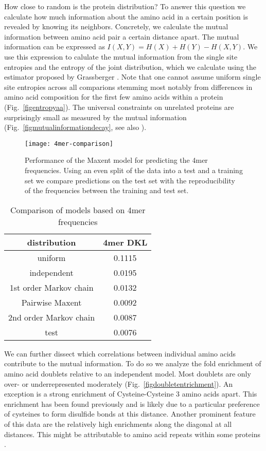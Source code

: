 \documentclass[superscriptaddress,twocolumn,pre]{revtex4}
\newcommand{\<}{\langle}
\renewcommand{\>}{\rangle}
\begin{document}
How close to random is the protein distribution? To answer this question we calculate how much information about the amino acid in a certain position is revealed by knowing its neighbors. Concretely, we calculate the mutual information between amino acid pair a certain distance apart. The mutual information can be expressed as $I(X, Y) = H(X) + H(Y) - H(X, Y)$. We use this expression to calulate the mutual information from the single site entropies and the entropy of the joint distribution, which we calculate using the estimator proposed by Grassberger \cite{Grassberger2003}. Note that one cannot assume uniform single site entropies across all comparions stemming most notably from differences in amino acid composition for the first few amino acids within a protein (Fig.~\ref{figentropyaa}). The universal constraints on unrelated proteins are surprisingly small as measured by the mutual information (Fig.~\ref{figmutualinformationdecay}, see also \cite{Lavelle2009}). 

\begin{figure}
    \texttt{[image: 4mer-comparison]}
    \caption{Performance of the Maxent model for predicting the 4mer frequencies. Using an even split of the data into a test and a training set we compare predictions on the test set with the reproducibility of the frequencies between the training and test set.
    \label{fig4mermaxent}
    }
\end{figure}

\begin{table}
    \begin{center}
        \begin{tabular}{ c c }
            distribution & 4mer DKL\\ \hline
            uniform & 0.1115\\
            independent & 0.0195\\
            1st order Markov chain & 0.0132\\
            Pairwise Maxent & 0.0092\\
            2nd order Markov chain & 0.0087\\
            test & 0.0076\\
        \end{tabular}
    \end{center}
    \caption{Comparison of models based on 4mer frequencies}
\end{table}

We can further dissect which correlations between individual amino acids contribute to the mutual information. To do so we analyze the fold enrichment of amino acid doublets relative to an independent model. Most doublets are only over- or underrepresented moderately (Fig.~\ref{figdoubletentrichment}). An exception is a strong enrichment of Cysteine-Cysteine 3 amino acids apart. This enrichment has been found previously \cite{Greenbaum2014} and is likely due to a particular preference of cysteines to form disulfide bonds at this distance. Another prominent feature of this data are the relatively high enrichments along the diagonal at all distances. This might be attributable to amino acid repeats within some proteins \cite{Turjanski2018}.
\end{document}

